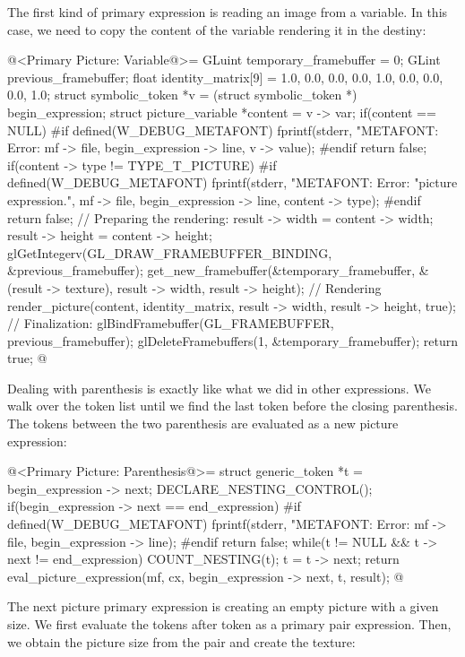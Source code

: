 {{{{{The first kind of primary expression is reading an image from a
variable. In this case, we need to copy the content of the variable
rendering it in the destiny:

\iniciocodigo
@<Primary Picture: Variable@>=
GLuint temporary_framebuffer = 0;
GLint previous_framebuffer;
float identity_matrix[9] = {1.0, 0.0, 0.0,
                             0.0, 1.0, 0.0,
                             0.0, 0.0, 1.0};
struct symbolic_token *v = (struct symbolic_token *) begin_expression;
struct picture_variable *content = v -> var;
if(content == NULL){
#if defined(W_DEBUG_METAFONT)
  fprintf(stderr, "METAFONT: Error: %
          mf -> file, begin_expression -> line, v -> value);
#endif
  return false;
}
if(content -> type != TYPE_T_PICTURE){
#if defined(W_DEBUG_METAFONT)
  fprintf(stderr, "METAFONT: Error: %
                  "picture expression.\n",
          mf -> file, begin_expression -> line, content -> type);
#endif
  return false;
}
// Preparing the rendering:
result -> width = content -> width;
result -> height = content -> height;
glGetIntegerv(GL_DRAW_FRAMEBUFFER_BINDING, &previous_framebuffer);
get_new_framebuffer(&temporary_framebuffer, &(result -> texture),
                    result -> width, result -> height);
// Rendering
render_picture(content, identity_matrix, result -> width, result -> height, true);
// Finalization:
glBindFramebuffer(GL_FRAMEBUFFER, previous_framebuffer);
glDeleteFramebuffers(1, &temporary_framebuffer);
return true;
@
\fimcodigo

Dealing with parenthesis is exactly like what we did in other
expressions. We walk over the token list until we find the last token
before the closing parenthesis. The tokens between the two parenthesis
are evaluated as a new picture expression:

\iniciocodigo
@<Primary Picture: Parenthesis@>=
struct generic_token *t = begin_expression -> next;
DECLARE_NESTING_CONTROL();
if(begin_expression -> next == end_expression){
#if defined(W_DEBUG_METAFONT)
  fprintf(stderr, "METAFONT: Error: %
          mf -> file, begin_expression -> line);
#endif
  return false;
}
while(t != NULL && t -> next != end_expression){
  COUNT_NESTING(t);
  t = t -> next;
}
return eval_picture_expression(mf, cx, begin_expression -> next, t, result);
@
\fimcodigo

The next picture primary expression is creating an empty picture with
a given size. We first evaluate the tokens
after  token as a primary pair
expression. Then, we obtain the picture size from the pair and create
the texture:

}}}}}
